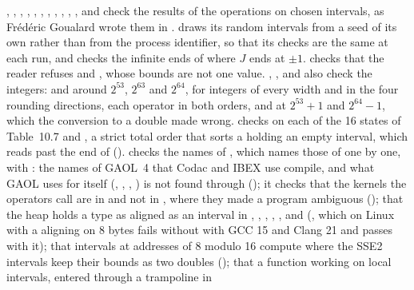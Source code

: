 , , ,
, , ,
, , ,
, ,  and
 check the results of the operations on chosen
intervals, as Fr\'ed\'eric Goualard wrote them in .
 draws its random intervals from a seed of its own
rather than from the process identifier, so that its checks are the same at
each run, and checks the infinite ends of  where $J$
ends at $\pm1$.\newinvfive{}  checks that the reader
refuses  and , whose bounds are not one
value. , , 
and  also check the integers:  and
 around $2^{53}$, $2^{63}$ and $2^{64}$, for integers of
every width and in the four rounding directions, each operator in both
orders, and  at $2^{53}+1$ and $2^{64}-1$, which the
conversion to a double made wrong.\newinvfive{}  checks
 on each of the 16 states of Table~10.7 and
, a strict total order that sorts a
 holding an empty interval, which \code{<} reads past the
end of ().\newinvfive{}  checks the
names of , which names those of  one by one,
with : the names of GAOL~4 that Codac and IBEX use
compile, and what GAOL uses for itself (,
, , ) is not
found through  (); it
checks that the kernels the operators call are in  and
not in , where they made a program ambiguous
(); that the heap
holds a type
as aligned as an interval in , ,
, , ,  and
 (, which on Linux with a
 aligning on 8 bytes fails without
 with GCC 15 and Clang 21 and passes with it); that
intervals at addresses of 8 modulo 16 compute where the SSE2 intervals keep
their bounds as two doubles ();
that a function working on local intervals, entered through a trampoline in
